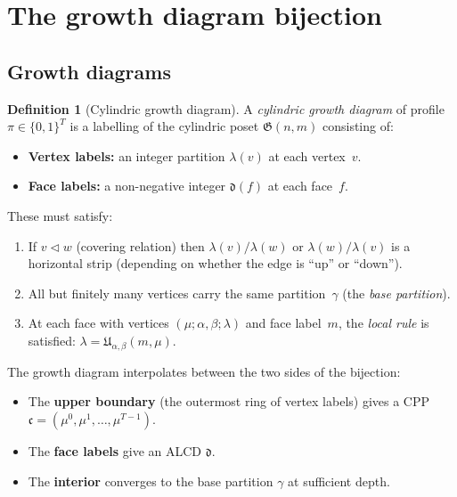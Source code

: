 \documentclass[11pt]{article}
\theoremstyle{plain}
\theoremstyle{definition}
\newtheorem{definition}[theorem]{Definition}
\begin{document}
\section{The growth diagram bijection}
\label{sec:growth-diagram}

\subsection{Growth diagrams}

\begin{definition}[Cylindric growth diagram]
\label{def:growth-diagram}
A \emph{cylindric growth diagram} of profile $\pi \in \{0,1\}^T$ is a
labelling of the cylindric poset $\mathfrak{G}(n,m)$ consisting of:
\begin{itemize}
  \item \textbf{Vertex labels:} an integer partition $\lambda(v)$ at
    each vertex~$v$.
  \item \textbf{Face labels:} a non-negative integer $\mathfrak{d}(f)$
    at each face~$f$.
\end{itemize}
These must satisfy:
\begin{enumerate}
  \item If $v \lhd w$ (covering relation) then $\lambda(v)/\lambda(w)$
    or $\lambda(w)/\lambda(v)$ is a horizontal strip (depending on
    whether the edge is ``up'' or ``down'').
  \item All but finitely many vertices carry the same partition~$\gamma$
    (the \emph{base partition}).
  \item At each face with vertices $(\mu; \alpha, \beta; \lambda)$
    and face label~$m$, the \emph{local rule} is satisfied:
    $\lambda = \mathfrak{U}_{\alpha,\beta}(m, \mu)$.
\end{enumerate}
\end{definition}

The growth diagram interpolates between the two sides of the bijection:
\begin{itemize}
  \item The \textbf{upper boundary} (the outermost ring of vertex
    labels) gives a CPP $\mathfrak{c} = (\mu^0, \mu^1, \ldots,
    \mu^{T-1})$.
  \item The \textbf{face labels} give an ALCD $\mathfrak{d}$.
  \item The \textbf{interior} converges to the base partition $\gamma$
    at sufficient depth.
\end{itemize}
\end{document}
